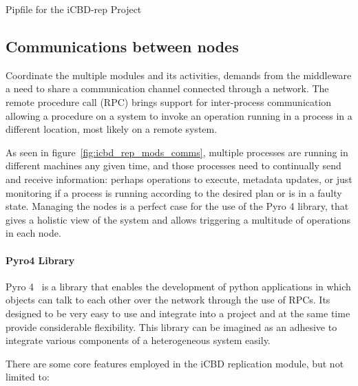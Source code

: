 \begin{listing}[ht]
\inputminted{python}{./Chapters/Code/cap4_pip.py}
\caption{Pipfile for the iCBD-rep Project}
\label{listing:impl_icbd_pipfile}
\end{listing}


\subsection{Communications between nodes}
\label{sub:impl_rep_comms}

Coordinate the multiple modules and its activities, demands from the middleware a need to share a communication channel connected through a network. 
The remote procedure call (RPC) brings support for inter-process communication allowing a procedure on a system to invoke an operation running in a process in a different location, most likely on a remote system.

As seen in figure~\ref{fig:icbd_rep_mods_comms}, multiple processes are running in different machines any given time, and those processes need to continually send and receive information: perhaps operations to execute, metadata updates, or just monitoring if a process is running according to the desired plan or is in a faulty state.
Managing the nodes is a perfect case for the use of the Pyro 4 library, that gives a holistic view of the system and allows triggering a multitude of operations in each node.


\paragraph{Pyro4 Library}
\label{par:impl_pyro4_lib}
Pyro 4~\cite{pyro4} is a library that enables the development of python applications in which objects can talk to each other over the network through the use of RPCs. Its designed to be very easy to use and integrate into a project and at the same time provide considerable flexibility. This library can be imagined as an adhesive to integrate various components of a heterogeneous system easily.

There are some core features employed in the iCBD replication module, but not limited to:


